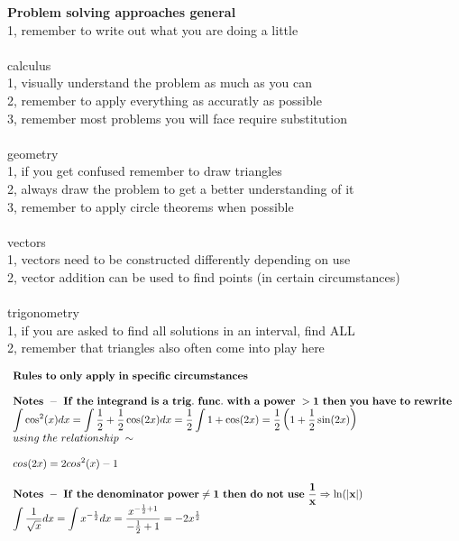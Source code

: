 \documentclass{article}
\begin{document}
\begin{flushleft}
\textbf{Problem solving approaches general}\\
1, remember to write out what you are doing a little\\
\hfill \\
calculus\\ 
1, visually understand the problem as much as you can\\
2, remember to apply everything as accuratly as possible\\ 
3, remember most problems you will face require substitution\\
\hfill \\
geometry\\
1, if you get confused remember to draw triangles\\
2, always draw the problem to get a better understanding of it\\ 
3, remember to apply circle theorems when possible\\
\hfill \\
vectors\\ 
1, vectors need to be constructed differently depending on use\\ 
2, vector addition can be used to find points (in certain circumstances)\\ 
\hfill \\
trigonometry\\
1, if you are asked to find all solutions in an interval, find ALL\\ 
2, remember that triangles also often come into play here
\end{flushleft}

\[ 
\begin{array}{>{\displaystyle}l}
    \mathbf{Rules\ to\ only\ apply\ in\ specific\ circumstances}\\
    \\
    \mathbf{Notes\ -\ If\ the\ integrand\ is\ a\ trig.\ func.\ with\ a\ power\  >1\ then\ you\ have\ to\ rewrite\ }\\
    \int \cos^{2}( x) dx=\int \frac{1}{2} +\frac{1}{2}\cos( 2x) dx=\frac{1}{2}\int 1+\cos( 2x) =\frac{1}{2}\left( 1+\frac{1}{2}\sin( 2x)\right)\\
    using\ the\ relationship\ \sim \\
    \\
    cos( 2x) =2cos^{2}( x) -1\\
    \\
    \mathbf{Notes\ -\ If\ the\ denominator\ power\neq 1\ then\ do\ not\ use\ \frac{1}{x} \Rightarrow \ln( |x|) \ }\\
    \int \frac{1}{\sqrt{x}} dx=\int x^{-\frac{1}{2}} dx=\frac{x^{-\frac{1}{2} +1}}{-\frac{1}{2} +1} =-2x^{\frac{1}{2}}\\
    \\
\end{array}
\]
\end{document}
